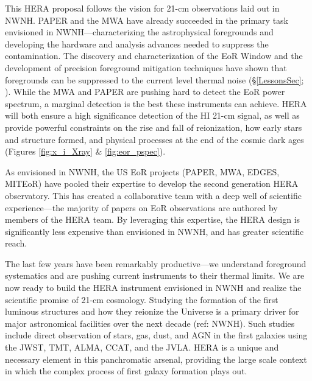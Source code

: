 \documentclass[preprint]{aastex}
\def\HI{{H{\small I }}}
\begin{document}
This HERA proposal follows the vision for 21-cm observations laid out in NWNH.
PAPER and the MWA have already succeeded in the primary task envisioned in
NWNH---characterizing the astrophysical foregrounds and developing the hardware
and analysis 
advances needed to suppress the contamination. The discovery and
characterization of the EoR Window and the development of precision foreground
mitigation techniques have shown that foregrounds can be suppressed to the current level
thermal noise (\S \ref{LessonsSec}; \citealt{parsons_et_al2013}). While the MWA
and PAPER are pushing hard to detect the EoR power spectrum, %
a marginal detection is the best these instruments can achieve.
HERA will both ensure a high significance detection of the \HI 21-cm 
signal, as
well as provide powerful constraints on the rise and fall of reionization, how
early stars and structure formed, and physical processes at the end of the
cosmic dark ages (Figures \ref{fig:x_i_Xray} \& \ref{fig:eor_pspec}).

As envisioned in NWNH, the US EoR projects (PAPER, MWA, EDGES, MITEoR) have
pooled their expertise to develop the second generation HERA observatory. This
has created a collaborative team with a deep well of scientific
experience---the majority of papers on EoR observations are authored by members
of the HERA team. By leveraging this expertise, the HERA design is significantly
less expensive than envisioned in 
NWNH, and has greater scientific reach.

The last few years have been remarkably productive---we
understand foreground systematics and are pushing 
current
instruments to their thermal limits. We are now ready to build the HERA
instrument envisioned in NWNH and realize the scientific promise of 21-cm
cosmology.
Studying the formation of the first luminous structures 
and how they reionize the Universe is a primary driver for 
major astronomical facilities over the next decade (ref: NWNH).
Such studies include direct 
observation of stars, gas, dust, and AGN in the
first galaxies using the JWST, TMT, ALMA, CCAT, and the JVLA. HERA is 
a unique and necessary element in this panchromatic arsenal, providing
the large scale context in which the complex process of first galaxy
formation plays out.

\clearpage
\setcounter{page}{1}
\thispagestyle{empty}
%
%

%

\end{document}
